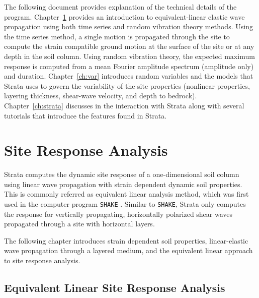 \documentclass[12pt,oneside]{book}
\begin{document}
The following document provides explanation of the technical details of the
program. Chapter~\ref{ch:sra} provides an introduction to
equivalent-linear elastic wave propagation using both time series and random
vibration theory methods. Using the time series method, a single motion is
propagated through the site to compute the strain compatible ground motion at
the surface of the site or at any depth in the soil column. Using random
vibration theory, the expected maximum response is computed from a mean Fourier
amplitude spectrum (amplitude only) and duration. Chapter~\ref{ch:var} introduces random
variables and the models that Strata uses to govern the variability of the site
properties (nonlinear properties, layering thickness, shear-wave velocity, and
depth to bedrock). Chapter~\ref{ch:strata} discusses in the interaction with
Strata along with several tutorials that introduce the features found in Strata.

\chapter{Site Response Analysis}\label{ch:sra}

Strata computes the dynamic site response of a one-dimensional soil column using
linear wave propagation with strain dependent dynamic soil properties.  This is
commonly referred as equivalent linear analysis method, which was first used in
the computer program \texttt{SHAKE} \citep{schnabel:72, shake91}.  Similar to
\texttt{SHAKE}, Strata only computes the response for vertically propagating,
horizontally polarized shear waves propagated through a site with horizontal
layers.

The following chapter introduces strain dependent soil properties,
linear-elastic wave propagation through a layered medium, and the equivalent
linear approach to site response analysis.

\section{Equivalent Linear Site Response Analysis}
\end{document}

